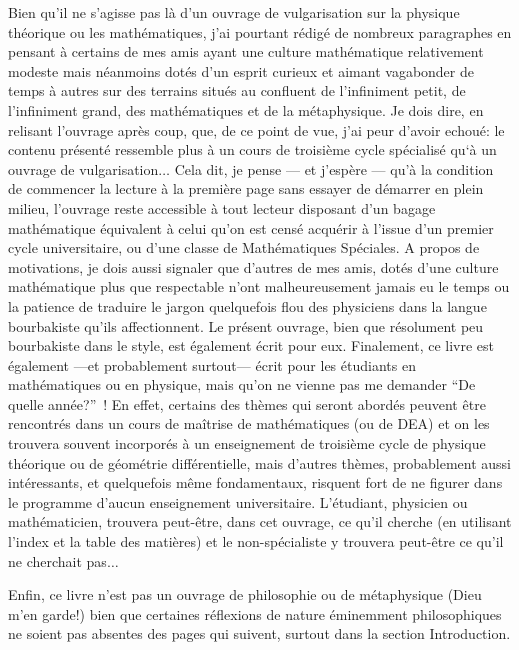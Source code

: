 Bien qu'il ne s'agisse pas l\`a d'un ouvrage de vulgarisation sur la
physique th\'eorique ou les math\'ematiques, j'ai pourtant
r\'edig\'e de nombreux paragraphes en pensant \`a certains de mes amis
ayant une culture math\'ematique relativement modeste mais
n\'eanmoins dot\'es d'un esprit curieux et aimant vagabonder de temps
\`a autres sur des terrains situ\'es au confluent de l'infiniment
petit, de l'infiniment grand, des math\'ematiques et de la
m\'etaphysique. Je dois dire, en relisant l'ouvrage apr\`es coup,
que, de ce point de vue, j'ai peur d'avoir echou\'e: le contenu
pr\'esent\'e ressemble plus \`a un cours de troisi\`eme cycle
sp\'ecialis\'e qu`\`a un ouvrage de vulgarisation$\ldots$
 Cela dit, je pense --- et j'esp\`ere --- qu'\`a la condition de commencer
la lecture \`a la premi\`ere page sans essayer de d\'emarrer en plein milieu,
l'ouvrage reste accessible \`a tout lecteur disposant d'un bagage math\'ematique
\'equivalent \`a celui qu'on est cens\'e acqu\'erir \`a l'issue d'un premier cycle universitaire,  ou d'une 
classe de Math\'ematiques Sp\'eciales.
A propos de motivations, je dois aussi
signaler que d'autres de mes amis, dot\'es d'une culture
math\'ematique plus que respectable n'ont malheureusement jamais eu
le temps ou la patience de traduire le jargon quelquefois flou des
physiciens dans la langue bourbakiste qu'ils affectionnent. Le
pr\'esent ouvrage, bien que r\'esolument peu bourbakiste dans le
style, est \'egalement \'ecrit pour eux. Finalement, ce livre est
\'egalement ---et probablement surtout--- \'ecrit pour les
\'etudiants en math\'ematiques ou en physique, mais qu'on ne vienne pas
me demander ``De quelle ann\'ee?''~!
En effet, certains des th\`emes qui seront abord\'es peuvent \^etre rencontr\'es dans un
cours de ma\^itrise de math\'ematiques (ou de DEA) et on les
trouvera souvent incorpor\'es \`a un enseignement de troisi\`eme cycle
de physique th\'eorique ou de g\'eom\'etrie diff\'erentielle, 
mais d'autres th\`emes, probablement aussi int\'eressants, et quelquefois m\^eme fondamentaux, risquent fort de ne figurer dans le programme d'aucun enseignement universitaire.
L'\'etudiant, physicien ou
math\'ematicien, trouvera peut-\^etre, dans cet ouvrage, ce qu'il
cherche (en utilisant l'index et la table des mati\`eres) et le
non-sp\'ecialiste y trouvera peut-\^etre ce qu'il ne cherchait pas$\ldots$ \par

Enfin, ce livre n'est pas un ouvrage de philosophie ou de
m\'etaphysique (Dieu m'en garde!) bien que certaines r\'eflexions de
nature \'eminemment philosophiques ne soient pas absentes des pages
qui suivent, surtout dans la section Introduction.\par

